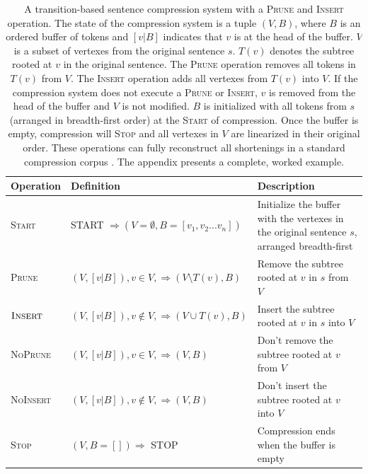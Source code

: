 \documentclass[11pt,a4paper]{article}
\begin{document}
\begin{table}[]
\centering
\begin{tabular}{llp{70mm}}
\textbf{Operation} &             \textbf{Definition}                                                    &      \textbf{Description}    \\ \hline
\textsc{Start}      & START $\Rightarrow ( V=\emptyset,  B=[v_1, v_2 ... v_n])$ & Initialize the buffer with the vertexes in the original sentence $s$, arranged breadth-first \\ \hline
\textsc{Prune}              & $(V, [v|B]), v \in V,  \Rightarrow (V \setminus  T(v), B)$ & Remove the subtree rooted at $v$ in $s$ from $V$ \\  
$\textsc{Insert}$             & $(V, [v|B]), v \notin V, \Rightarrow (V \cup T(v), B)$ & Insert the subtree rooted at $v$ in $s$ into $V$  \\ \hline
\textsc{NoPrune}           & $(V, [v|B]), v \in V, \Rightarrow (V, B)$ & Don't remove the subtree rooted at $v$ from $V$  \\ 
\textsc{NoInsert}          &       $(V, [v|B]), v \notin V, \Rightarrow (V, B)$ &   Don't insert the subtree rooted at $v$ into $V$    \\ \hline
\textsc{Stop}             & $ (V, B=[]) \Rightarrow$ STOP & Compression ends when the buffer is empty \\                                               
\end{tabular}
\caption{A transition-based sentence compression system with a \textsc{Prune} and \textsc{Insert} operation. The state of the compression system is a tuple $(V, B)$, where $B$ is an ordered buffer of tokens and $[v|B]$ indicates that $v$ is at the head of the buffer. $V$ is a subset of vertexes from the original sentence $s$. $T(v)$ denotes the subtree rooted at $v$ in the original sentence. The \textsc{Prune} operation removes all tokens in $T(v)$ from $V$. The \textsc{Insert} operation adds all vertexes from $T(v)$ into $V$. If the compression system does not execute a \textsc{Prune} or \textsc{Insert}, $v$ is removed from the head of the buffer and $V$ is not modified. $B$ is initialized with all tokens from $s$ (arranged in breadth-first order) at the \textsc{Start} of compression. Once the buffer is empty, compression will \textsc{Stop} and all vertexes in $V$ are linearized in their original order. These operations can fully reconstruct all shortenings in a standard compression corpus \cite{filippova2013overcoming}. The appendix presents a complete, worked example.}
\label{t:ops}
\end{table}
\end{document}

